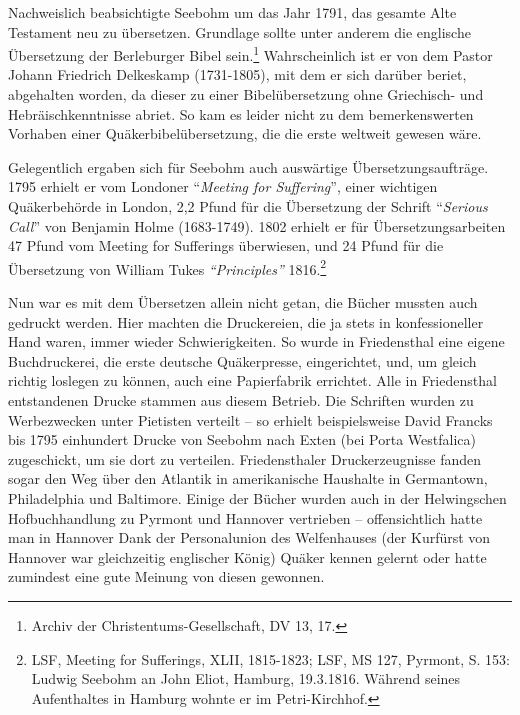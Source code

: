 \medskip

Nachweislich beabsichtigte Seebohm um das Jahr 1791, das gesamte Alte Testament
neu zu übersetzen. Grundlage sollte unter anderem die englische Übersetzung der
Berleburger Bibel sein.\footnote{Archiv
der Christentums-Gesellschaft, DV 13, 17.} Wahrscheinlich ist er von dem Pastor
Johann Friedrich Delkeskamp
(1731-1805), mit dem er sich darüber beriet, abgehalten worden, da dieser zu
einer Bibelübersetzung ohne Griechisch- und
Hebräischkenntnisse abriet. So kam es leider nicht zu dem bemerkenswerten
Vorhaben einer Quäkerbibelübersetzung, die die erste weltweit gewesen wäre.

\medskip

Gelegentlich ergaben sich für Seebohm auch auswärtige Übersetzungsaufträge. 1795
erhielt er vom Londoner "`\textit{Meeting for Suffering}"', einer wichtigen Quäkerbehörde in London, 2,2
Pfund für die Übersetzung der Schrift "`\textit{Serious Call}"' von Benjamin
Holme (1683-1749). 1802 erhielt er für
Übersetzungsarbeiten 47 Pfund vom Meeting for Sufferings überwiesen, und 24
Pfund für die Übersetzung von William Tukes \textit{"`Principles"'} 1816.\footnote{LSF,
Meeting for Sufferings, XLII, 1815-1823; LSF, MS 127, Pyrmont, S. 153:
Ludwig Seebohm an John Eliot, Hamburg, 19.3.1816. Während seines Aufenthaltes in
Hamburg wohnte er im Petri-Kirchhof.}

\medskip

Nun war es mit dem Übersetzen allein nicht getan, die Bücher mussten auch
gedruckt werden. Hier machten die Druckereien, die ja stets in
konfessioneller Hand waren, immer wieder Schwierigkeiten. So wurde in
Friedensthal eine eigene Buchdruckerei, die erste deutsche
Quäkerpresse, eingerichtet, und, um gleich
richtig loslegen zu können, auch eine Papierfabrik
errichtet. Alle in Friedensthal entstandenen Drucke stammen aus diesem Betrieb.
Die Schriften wurden zu Werbezwecken unter Pietisten
verteilt -- so erhielt beispielsweise David Francks bis 1795 einhundert Drucke von Seebohm nach Exten (bei
Porta Westfalica) zugeschickt, um sie dort zu
verteilen. Friedensthaler Druckerzeugnisse fanden sogar den Weg über den
Atlantik in amerikanische Haushalte in Germantown,
Philadelphia und Baltimore.
Einige der Bücher wurden auch in der Helwingschen Hofbuchhandlung zu Pyrmont und
Hannover vertrieben -- offensichtlich hatte man in
Hannover Dank der Personalunion des Welfenhauses
(der Kurfürst von Hannover war gleichzeitig englischer König) Quäker kennen
gelernt oder hatte zumindest eine gute Meinung von diesen gewonnen.

